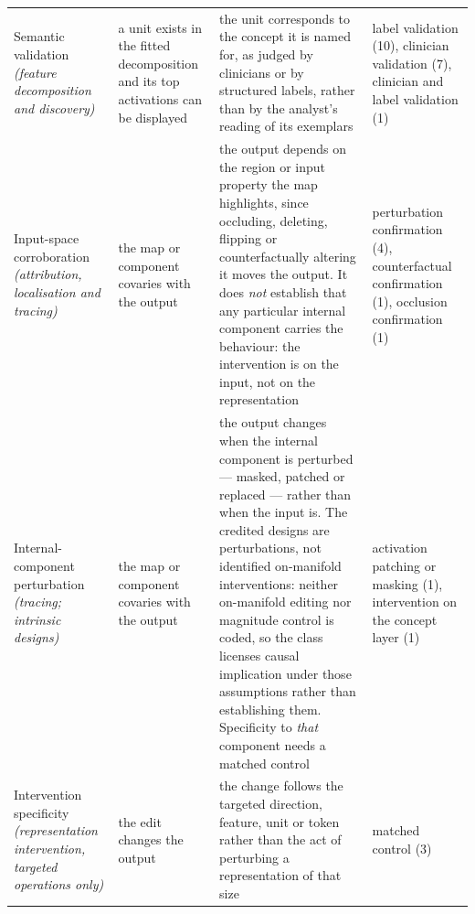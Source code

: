 \begin{table}
\begin{tabular}{@{}L{3.2cm}L{4.0cm}L{11.6cm}L{4.0cm}@{}}
Semantic validation \emph{(feature decomposition and discovery)} & a unit exists in the fitted decomposition and its top activations can be displayed & the unit corresponds to the concept it is named for, as judged by clinicians or by structured labels, rather than by the analyst's reading of its exemplars & label validation (10), clinician validation (7), clinician and label validation (1) \\
Input-space corroboration \emph{(attribution, localisation and tracing)} & the map or component covaries with the output & the output depends on the region or input property the map highlights, since occluding, deleting, flipping or counterfactually altering it moves the output. It does \emph{not} establish that any particular internal component carries the behaviour: the intervention is on the input, not on the representation & perturbation confirmation (4), counterfactual confirmation (1), occlusion confirmation (1) \\
Internal-component perturbation \emph{(tracing; intrinsic designs)} & the map or component covaries with the output & the output changes when the internal component is perturbed --- masked, patched or replaced --- rather than when the input is. The credited designs are perturbations, not identified on-manifold interventions: neither on-manifold editing nor magnitude control is coded, so the class licenses causal implication under those assumptions rather than establishing them. Specificity to \emph{that} component needs a matched control & activation patching or masking (1), intervention on the concept layer (1) \\
Intervention specificity \emph{(representation intervention, targeted operations only)} & the edit changes the output & the change follows the targeted direction, feature, unit or token rather than the act of perturbing a representation of that size & matched control (3) \\
\bottomrule
\end{tabular}
\end{table}
